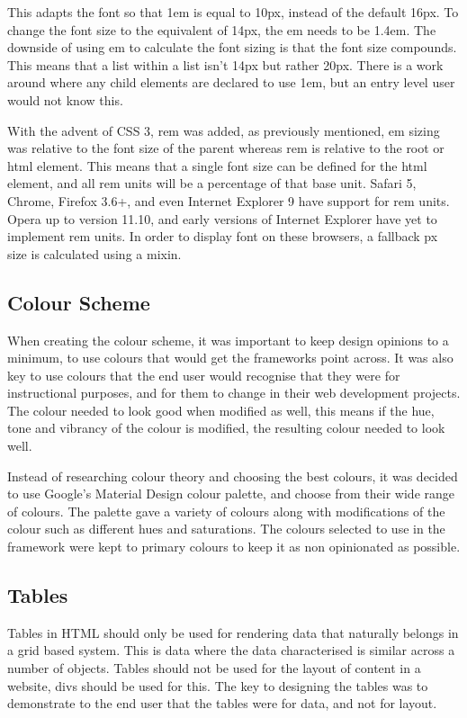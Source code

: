 This adapts the font so that 1em is equal to 10px, instead of the default 16px. To change the font size to the equivalent of 14px, the \gls{em} needs to be 1.4em. The downside of using em to calculate the font sizing is that the font size compounds. This means that a list within a list isn't 14px but rather 20px. There is a work around where any child elements are declared to use 1em, but an entry level user would not know this. 

With the advent of \gls{CSS} 3, \gls{rem} was added, as previously mentioned, \gls{em} sizing was relative to the font size of the parent whereas \gls{rem} is relative to the root or html element. This means that a single font size can be defined for the html element, and all \gls{rem} units will be a percentage of that base unit. Safari 5, Chrome, Firefox 3.6+, and even Internet Explorer 9 have support for \gls{rem} units. Opera up to version 11.10, and early versions of Internet Explorer have yet to implement \gls{rem} units. In order to display font on these browsers, a fallback \gls{px} size is calculated using a mixin. 

\newpage
\subsection*{Colour Scheme}
When creating the colour scheme, it was important to keep design opinions to a minimum, to use colours that would get the frameworks point across. It was also key to use colours that the end user would recognise that they were for instructional purposes, and for them to change in their web development projects. The colour needed to look good when modified as well, this means if the hue, tone and vibrancy of the colour is modified, the resulting colour needed to look well. 

Instead of researching colour theory and choosing the best colours, it was decided to use Google's Material Design \citet{Google17} colour palette, and choose from their wide range of colours. The palette  gave a variety of colours along with modifications of the colour such as different hues and saturations. The colours selected to use in the framework were kept to primary colours to keep it as non opinionated as possible.

\subsection*{Tables}
Tables in HTML should only be used for rendering data that naturally belongs in a grid based system. This is data where the data characterised is similar across a number of objects. Tables should not be used for the layout of content in a website, divs should be used for this. The key to designing the tables was to demonstrate to the end user that the tables were for data, and not for layout.

